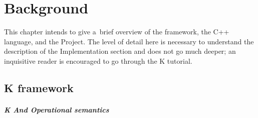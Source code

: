 \documentclass{fithesis3}
\newcommand{\Project}{Project\xspace}
\begin{document}



\chapter{Background}
This chapter intends to give a~brief overview of the \K framework, the C++ language, and the \Project.
The level of detail here is necessary to understand the description of the Implementation section and does not go much deeper; an inquisitive reader is encouraged to go through the K tutorial. %

\section{K framework}

%
%
%
%
%
%


\paragraph{K And Operational semantics}


\end{document}
